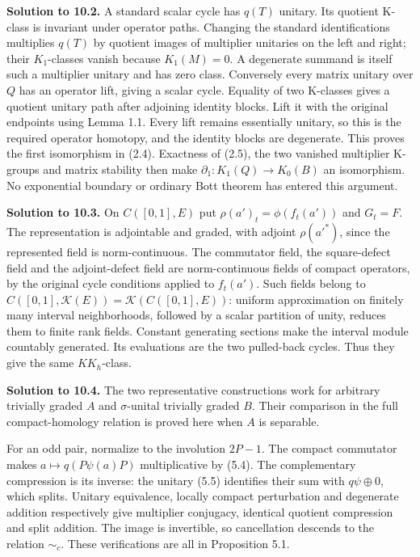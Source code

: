 \documentclass[
  11pt,
]{article}
\begin{document}
\textbf{Solution to 10.2.} A standard scalar cycle has \(q(T)\) unitary.
Its quotient K-class is invariant under operator paths. Changing the
standard identifications multiplies \(q(T)\) by quotient images of
multiplier unitaries on the left and right; their \(K_1\)-classes vanish
because \(K_1(M)=0\). A degenerate summand is itself such a multiplier
unitary and has zero class. Conversely every matrix unitary over \(Q\)
has an operator lift, giving a scalar cycle. Equality of two K-classes
gives a quotient unitary path after adjoining identity blocks. Lift it
with the original endpoints using Lemma 1.1. Every lift remains
essentially unitary, so this is the required operator homotopy, and the
identity blocks are degenerate. This proves the first isomorphism in
(2.4). Exactness of (2.5), the two vanished multiplier K-groups and
matrix stability then make \(\partial_1:K_1(Q)\to K_0(B)\) an
isomorphism. No exponential boundary or ordinary Bott theorem has
entered this argument.

\textbf{Solution to 10.3.} On \(C([0,1],E)\) put
\(\rho(a')_t=\phi(f_t(a'))\) and \(G_t=F\). The representation is
adjointable and graded, with adjoint \(\rho(a'^*)\), since the
represented field is norm-continuous. The commutator field, the
square-defect field and the adjoint-defect field are norm-continuous
fields of compact operators, by the original cycle conditions applied to
\(f_t(a')\). Such fields belong to
\(C([0,1],\mathcal K(E))=\mathcal K(C([0,1],E))\): uniform approximation
on finitely many interval neighborhoods, followed by a scalar partition
of unity, reduces them to finite rank fields. Constant generating
sections make the interval module countably generated. Its evaluations
are the two pulled-back cycles. Thus they give the same \(KK_h\)-class.

\textbf{Solution to 10.4.} The two representative constructions work for
arbitrary trivially graded \(A\) and \(\sigma\)-unital trivially graded
\(B\). Their comparison in the full compact-homology relation is proved
here when \(A\) is separable.

For an odd pair, normalize to the involution \(2P-1\). The compact
commutator makes \(a\mapsto q(P\psi(a)P)\) multiplicative by (5.4). The
complementary compression is its inverse: the unitary (5.5) identifies
their sum with \(q\psi\oplus0\), which splits. Unitary equivalence,
locally compact perturbation and degenerate addition respectively give
multiplier conjugacy, identical quotient compression and split addition.
The image is invertible, so cancellation descends to the relation
\(\sim_c\). These verifications are all in Proposition 5.1.
\end{document}
